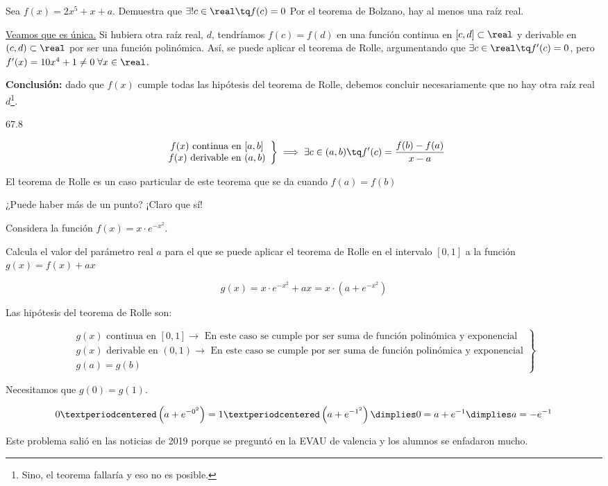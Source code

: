 \begin{problem}
Sea $f(x) = 2x^5+x+a$.  Demuestra que $\exists!c\in\real\tq f(c)=0$
\solution
Por el teorema de Bolzano, hay al menos una raíz real.

\ul{Veamos que es única.} Si hubiera otra raíz real, $d$, tendríamos $f(c) = f(d)$ en una función continua en $[c,d]\subset\real$ y derivable en $(c,d)\subset\real$ por ser una función polinómica.
%
Así, se puede aplicar el teorema de Rolle, argumentando que $\exists c\in\real\tq f'(c) = 0$, pero $f'(x) = 10x^4+1 \neq 0 \;\forall x\in\real$.

\textbf{Conclusión: } dado que $f(x)$ cumple todas las hipótesis del teorema de Rolle, debemos concluir necesariamente que no hay otra raíz real $d$\footnote{Sino, el teorema fallaría y eso no es posible.}. 
\end{problem}

\begin{problem}
67.8
\solution
\end{problem}

\begin{theorem}
\[
\left.
	\begin{array}{c}
		f(x)\text{ continua en } [a,b]\\
		f(x)\text{ derivable en } (a,b)\\
	\end{array}
\right\}\implies \exists c\in(a,b)\tq f'(c)=\frac{f(b)-f(a)}{x-a}
\]

\obs El teorema de Rolle es un caso particular de este teorema que se da cuando $f(a) = f(b)$
\end{theorem}
\obs ¿Puede haber más de un punto? ¡Claro que sí!

\begin{problem}
Considera la función $f(x) = x·e^{-x^2}$.

Calcula el valor del parámetro real $a$ para el que se puede aplicar el teorema de Rolle en el intervalo $[0,1]$ a la función $g(x) = f(x) + ax$
\solution

\[g(x) = x·e^{-x^2} + ax = x·\left(a+e^{-x^2}\right)\]

Las hipótesis del teorema de Rolle son:

\[
\left.
	\begin{array}{l}
		g(x)\text{ continua en } [0,1] \to \text{ En este caso se cumple por ser suma de función polinómica y exponencial}\\
		g(x)\text{ derivable en } (0,1) \to \text{ En este caso se cumple por ser suma de función polinómica y exponencial}\\
		g(a)=g(b) 
	\end{array}
\right\}
\]

Necesitamos que $g(0) = g(1)$. 

\[0·\left(a+e^{-0^2}\right) = 1·\left(a+e^{-1^2}\right) \dimplies 0 = a+e^{-1} \dimplies a=-e^{-1}\]

\obs Este problema salió en las noticias de 2019 porque se preguntó en la EVAU de valencia y los alumnos se enfadaron mucho.
\end{problem}

